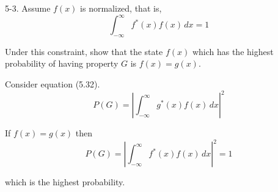 \documentclass[12pt]{article}
\begin{document}
5-3. Assume $f(x)$ is normalized, that is,
\begin{equation*}
\int_{-\infty}^\infty f^*(x)f(x)\,dx=1
\end{equation*}

Under this constraint, show that the state $f(x)$ which has the
highest probability of having property $G$ is $f(x)=g(x)$.

\bigskip
Consider equation (5.32).
\begin{equation*}
P(G)=\left|\int_{-\infty}^\infty g^*(x)f(x)\,dx\right|^2
\tag{5.32}
\end{equation*}

If $f(x)=g(x)$ then
\begin{equation*}
P(G)=\left|\int_{-\infty}^\infty f^*(x)f(x)\,dx\right|^2=1
\end{equation*}

which is the highest probability.
\end{document}
